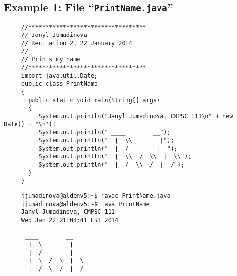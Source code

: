 \subsection*{Example 1: File ``{\tt PrintName.java}''}
\begin{verbatim}
     //**********************************
     // Janyl Jumadinova
     // Recitation 2, 22 January 2014
     //
     // Prints my name
     //**********************************
     import java.util.Date;
     public class PrintName
     {
       public static void main(String[] args)
       {
          System.out.println("Janyl Jumadinova, CMPSC 111\n" + new Date() + "\n");
          System.out.println(" ____        __");
          System.out.println("  |  \\        |");
          System.out.println("  |__/   __   |__");
          System.out.println("  |  \\  /  \\  |  \\");
          System.out.println(" _|__/  \\__/ _|__/");
       }
     }
\end{verbatim}

\begin{verbatim}
     jjumadinova@aldenv5:~$ javac PrintName.java
     jjumadinova@aldenv5:~$ java PrintName
     Janyl Jumadinova, CMPSC 111
     Wed Jan 22 21:04:41 EST 2014
     
      ____        __
       |  \        |
       |__/   __   |__
       |  \  /  \  |  \
      _|__/  \__/ _|__/
\end{verbatim}

\newpage

